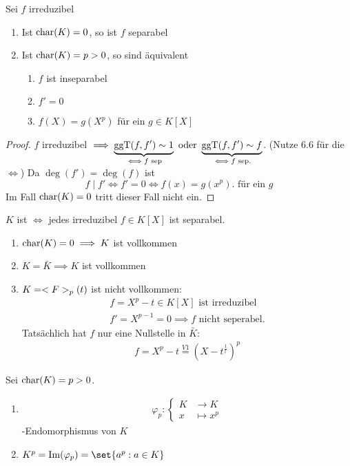 \begin{conclusion}
	Sei $f$ irreduzibel
	\begin{enumerate}[label={(\alph*)}]
		\item Ist $\operatorname{char}(K) = 0$, so ist $f$ separabel
		\item Ist $\operatorname{char}(K) = p>0$, so sind äquivalent
		\begin{enumerate}[label={(\arabic*)}]
			\item $f$ ist inseparabel
			\item $f' = 0$
			\item $f(X) = g(X^p)$ für ein $g \in K[X]$
		\end{enumerate}
	\end{enumerate}
\end{conclusion}
\begin{proof}
	$f$ irreduzibel $\implies \underbrace{\operatorname{ggT}(f,f') \sim 1}_{\iff f \text{ sep}} \text{ oder } \underbrace{\operatorname{ggT}(f,f') \sim f}_{\iff f \text{ sep.}}$. (Nutze 6.6 für die $\iff$) Da $\deg(f') = \deg(f)$ ist
	\[
		f \mid f' \iff f' = 0 \iff f(x) = g(x^p). \text{ für ein }g
	\]
	Im Fall $\operatorname{char}(K) = 0$ tritt dieser Fall nicht ein.
\end{proof}
\begin{definition}[vollkommen]
	$K$ ist  $\iff$ jedes irreduzibel $f \in K[X]$ ist separabel.
\end{definition}
\begin{example}
	\begin{enumerate}
		\item $\operatorname{char}(K) = 0 \implies K$ ist vollkommen
		\item $K = \bar{K} \implies K$ ist vollkommen
		\item $K = <F>_p (t)$ ist nicht vollkommen:
		\begin{align*}
			f = X^p - t \in K[X] \text{ ist irreduzibel}\\
			f' = X^{p-1} = 0 \implies f \text{ nicht seperabel.}
		\end{align*}
		Tatsächlich hat $f$ nur eine Nullstelle in $\bar{K}$:
		\begin{align*}
			f = X^p - t \overset{V1}{=} (X - t^{\frac{1}{t}})^p
		\end{align*}
	\end{enumerate}
\end{example}
\begin{definition}[title]
	Sei $\operatorname{char}(K) = p > 0$.
	\begin{enumerate}
		\item \begin{align*}
		\varphi_p : \begin{cases}
		K &\to K\\
		x &\mapsto x^p 
		\end{cases}
		\end{align*}
		-Endomorphismus von $K$
		\item $K^p = \Image(\varphi_p) = \set{a^p : a \in K}$
	\end{enumerate}
\end{definition}
